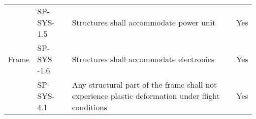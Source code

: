 \begin{table}[H]
\begin{scriptsize}
\begin{tabular}{|p{1cm}|p{1.5cm}|p{10cm}|p{3cm}|}
                          
\multirow{4}{*}{Frame}   & SP-SYS-1.5    & Structures shall accommodate power unit    &\cellcolor[HTML]{C1FFC1}Yes                                                                                  \\\cline{2-4} 
                          & SP-SYS -1.6  & Structures shall accommodate electronics  &\cellcolor[HTML]{C1FFC1}Yes                                                                                    \\\cline{2-4} 
                          & SP-SYS-4.1    & Any structural part of the frame shall not experience plastic deformation under flight conditions & \cellcolor[HTML]{C1FFC1}Yes                             \\\cline{2-4} 
                          

\end{tabular}
\end{scriptsize}
\end{table}
